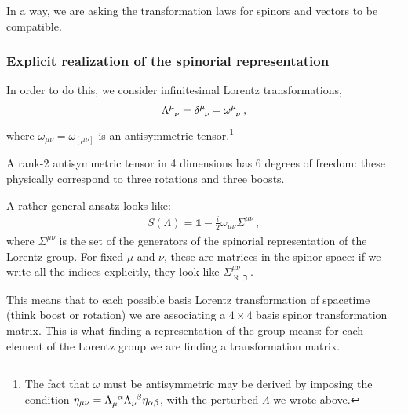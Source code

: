 \documentclass[main.tex]{subfiles}
\begin{document}
In a way, we are asking the transformation laws for spinors and vectors to be compatible. 

\subsubsection{Explicit realization of the spinorial representation}

In order to do this, we consider infinitesimal Lorentz transformations, 
%
\begin{align}
\tensor{\Lambda }{^{\mu }_{\nu }} = \tensor{ \delta }{^{\mu }_{\nu }} + \tensor{\omega}{^{\mu}_{\nu }}
\,,
\end{align}
%
where \(\omega_{\mu \nu } = \omega_{[\mu \nu ]}\) is an antisymmetric tensor.\footnote{The fact that \(\omega \) must be antisymmetric may be derived by imposing the condition \(\eta_{\mu \nu } = \tensor{\Lambda }{_{\mu }^{\alpha }} \tensor{\Lambda }{_{\nu }^{\beta }} \eta_{\alpha \beta }\), with the perturbed \(\Lambda \) we wrote above.}

A rank-2 antisymmetric tensor in 4 dimensions has 6 degrees of freedom: these physically correspond to three rotations and three boosts. 

A rather general ansatz looks like:
%
\begin{align}
S(\Lambda ) = \mathbb{1} - \frac{i}{2} \omega_{\mu \nu } \Sigma^{\mu \nu }
\,,
\end{align}
%
where \(\Sigma^{\mu \nu }\) is the set of the generators of the spinorial representation of the Lorentz group. For fixed \(\mu \) and \(\nu \), these are matrices in the spinor space: if we write all the indices explicitly, they look like \(\Sigma^{\mu \nu }_{\aleph \beth}\). 

This means that to each possible basis Lorentz transformation of spacetime (think boost or rotation) we are associating a \(4 \times 4\) basis spinor transformation matrix. 
This is what finding a representation of the group means: for each element of the Lorentz group we are finding a transformation matrix. 
\end{document}

